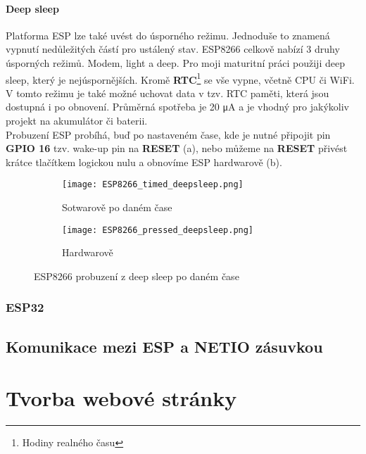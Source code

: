 \documentclass[a4paper, 12pt]{report}
\begin{document}
					\subsubsection{Deep sleep}
						Platforma ESP lze také uvést do úsporného režimu. Jednoduše to znamená vypnutí nedůležitých částí pro ustálený stav. ESP8266 celkově nabízí 3 druhy úsporných režimů. Modem, light a deep. Pro moji maturitní práci použiji deep sleep, který je nejúspornějších. Kromě {\bf RTC}\footnote{Hodiny realného času} se vše vypne, včetně CPU či WiFi. V tomto režimu je také možné uchovat data v tzv. RTC paměti, která jsou dostupná i po obnovení. Průměrná spotřeba je 20 \si{\micro A} a je vhodný pro jakýkoliv projekt na akumulátor či baterii. \\
						Probuzení ESP probíhá, buď po nastaveném čase, kde je nutné připojit pin {\bf GPIO 16} tzv. wake-up pin na {\bf RESET} (a), nebo můžeme na {\bf RESET} přivést krátce tlačítkem logickou nulu a obnovíme ESP hardwarově (b).

						\begin{figure}[h!]
						  \centering
						  \begin{subfigure}[b]{0.4\linewidth}
						    \texttt{[image: ESP8266\_timed\_deepsleep.png]}
						    \caption{Sotwarově po daném čase}
						  \end{subfigure}
						  \begin{subfigure}[b]{0.4\linewidth}
						    \texttt{[image: ESP8266\_pressed\_deepsleep.png]}
						    \caption{Hardwarově}
						  \end{subfigure}
						  \caption{ESP8266 probuzení z deep sleep po daném čase}
						  \label{ESP8266_timed_pressed_deepsleep}
						\end{figure}


			\subsection{ESP32}
		\section{Komunikace mezi ESP a NETIO zásuvkou}

	\chapter{Tvorba webové stránky}

\end{document}
